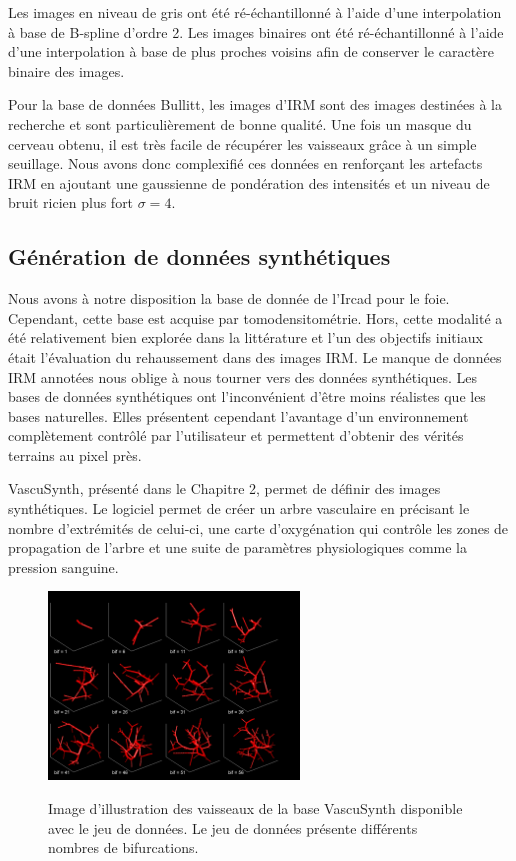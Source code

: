 Les images en niveau de gris ont été ré-échantillonné à l'aide d'une interpolation à base de B-spline d'ordre 2.
Les images binaires ont été ré-échantillonné à l'aide d'une interpolation à base de plus proches voisins afin de conserver le caractère binaire des images.

Pour la base de données Bullitt, les images d'IRM sont des images destinées à la recherche et sont particulièrement de bonne qualité. Une fois un masque du cerveau obtenu, il est très facile de récupérer les vaisseaux grâce à un simple seuillage. Nous avons donc complexifié ces données en renforçant les artefacts IRM en ajoutant une gaussienne de pondération des intensités et un niveau de bruit ricien plus fort $\sigma=4$. 

\subsection{Génération de données synthétiques}

Nous avons à notre disposition la base de donnée de l'Ircad pour le foie. Cependant, cette base est acquise par tomodensitométrie. Hors, cette modalité a été relativement bien explorée dans la littérature et l'un des objectifs initiaux était l'évaluation du rehaussement dans des images IRM. Le manque de données IRM annotées nous oblige à nous tourner vers des données synthétiques. Les bases de données synthétiques ont l'inconvénient d'être moins réalistes que les bases naturelles. Elles présentent cependant l'avantage d'un environnement complètement contrôlé par l'utilisateur et permettent d'obtenir des vérités terrains au pixel près.

VascuSynth, présenté dans le Chapitre 2, permet de définir des images synthétiques. Le logiciel permet de créer un arbre vasculaire en précisant le nombre d'extrémités de celui-ci, une carte d'oxygénation qui contrôle les zones de propagation de l'arbre et une suite de paramètres physiologiques comme la pression sanguine.

\begin{figure}
  \centering
  \includegraphics[height=5cm]{Images/snapVascu.png}
  \label{fig:smart_mask_effect}
  \caption{Image d'illustration des vaisseaux de la base VascuSynth disponible avec le jeu de données. Le jeu de données présente différents nombres de bifurcations.}
\end{figure}


